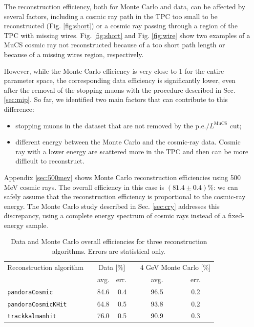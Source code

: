 \documentclass[a4paper]{scrartcl}
\renewcommand{\arraystretch}{1.2}
\newcommand{\ra}[1]{\renewcommand{\arraystretch}{#1}}
\begin{document}
The reconstruction efficiency, both for Monte Carlo and data, can be affected by several factors, including a cosmic ray path in the TPC too small to be reconstructed (Fig. \ref{fig:short}) or a cosmic ray passing through a region of the TPC with missing wires. Fig. \ref{fig:short} and Fig. \ref{fig:wire} show two examples of a MuCS cosmic ray not reconstructed because of a too short path length or because of a missing wires region, respectively.

However, while the Monte Carlo efficiency is very close to 1 for the entire parameter space, the corresponding data efficiency is significantly lower, even after the removal of the stopping muons with the procedure described in Sec. \ref{sec:mip}. So far, we identified two main factors that can contribute to this difference:
\begin{itemize}
  \item{stopping muons in the dataset that are not removed by the p.e./$L^{\mathrm{MuCS}}$ cut;}
  \item{different energy between the Monte Carlo and the cosmic-ray data. Cosmic ray with a lower energy are scattered more in the TPC and then can be more difficult to reconstruct.}
\end{itemize}

Appendix \ref{sec:500mev} shows Monte Carlo reconstruction efficiencies using 500 MeV cosmic rays. The overall efficiency in this case is $(81.4\pm0.4)\%$: we can safely assume that the reconstruction efficiency is proportional to the cosmic-ray energy. The Monte Carlo study described in Sec. \ref{sec:cry} addresses this discrepancy, using a complete energy spectrum of cosmic rays instead of a fixed-energy sample.

\begin{table}[htbp]
  \centering
  \ra{1.2}
  \begin{tabular}{lcrrrcc}
    \toprule
    Reconstruction algorithm & \phantom{abc}& \multicolumn{2}{c}{Data [\%]} & \phantom{abc} & \multicolumn{2}{c}{4 GeV Monte Carlo [\%]}\\
    \cmidrule{3-4} \cmidrule{6-7}
    & & avg. & err. & & avg. & err. \\
    \midrule
    \texttt{pan\-do\-ra\-Co\-smic} & & 84.6 & 0.4 & & 96.5& 0.2 \\
    \texttt{pandoraCosmicKHit} & & 64.8 & 0.5 & & 93.8& 0.2 \\
    \texttt{trackkalmanhit} & & 76.0 & 0.5 & & 90.9& 0.3 \\
    \bottomrule
  \end{tabular}
  \caption{Data and Monte Carlo overall efficiencies for three reconstruction algorithms. Errors are statistical only.}\label{tab:eff}
\end{table}
\end{document}
